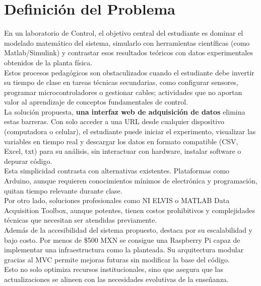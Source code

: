 \section{Definición del Problema}

En un laboratorio de Control, el objetivo central del estudiante es dominar el modelado matemático del sistema, simularlo con herramientas científicas (como Matlab/Simulink) y contrastar esos resultados teóricos con datos experimentales obtenidos de la planta física. \\
Estos procesos pedagógicos son obstaculizados cuando el estudiante debe invertir su tiempo de clase en tareas técnicas secundarias, como configurar sensores, programar microcontroladores o gestionar cables; actividades que no aportan valor al aprendizaje de conceptos fundamentales de control.\\

La solución propuesta, \textbf{una interfaz web de adquisición de datos} elimina estas barreras. Con solo acceder a una URL desde cualquier dispositivo (computadora o celular), el estudiante puede iniciar el experimento, visualizar las variables en tiempo real y descargar los datos en formato compatible (CSV, Excel, txt) para su análisis, sin interactuar con hardware, instalar software o depurar código.\\
Esta simplicidad contrasta con alternativas existentes. Plataformas como Arduino, aunque requieren conocimientos mínimos de electrónica y programación, quitan tiempo relevante durante clase.\\
Por otro lado, soluciones profesionales como NI ELVIS o MATLAB Data Acquisition Toolbox, aunque potentes, tienen costos prohibitivos y complejidades técnicas que necesitan ser atendidas previamente.\\

Además de la accesibilidad del sistema propuesto, destaca por su escalabilidad y bajo costo. Por menos de \$500 MXN se consigue una Raspberry Pi capaz de implementar una infraestructura como la planteada. Su arquitectura modular gracias al MVC permite mejoras futuras sin modificar la base del código.\\
Esto no solo optimiza recursos institucionales, sino que asegura que las actualizaciones se alineen con las necesidades evolutivas de la enseñanza.
